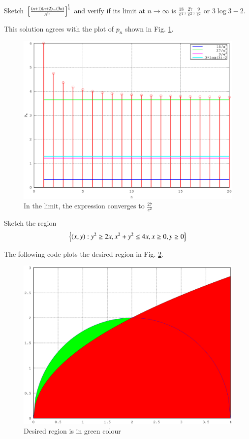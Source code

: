 \documentclass[journal,12pt,twocolumn]{IEEEtran}
\begin{document}
%
\begin{problem}
Sketch ${}\left[\frac{\left(n+1\right)\left(n+2\right)\dots \left(3n\right)}{n^{2n}}\right]^{\frac{1}{n}}$ and verify if its limit at $n \rightarrow \infty $ is $\frac{18}{e^4},\frac{27}{e^2},\frac{9}{e^2}$ or $3\log 3 -2$.
\end{problem}
\solution	

This solution agrees with the plot of $p_n$ shown in Fig. \ref{fig_32}.

%
\begin{figure}[h]
\centering
\includegraphics[width=\columnwidth]{./version_2/ee16b1032/ee16b1032}
\caption{ In the limit, the expression converges to $\frac{27}{e^2}$}
\label{fig_32}	
\end{figure}
%
\begin{problem}
Sketch the region 
\begin{equation*}
\left\{\left(x,y\right): y^2 \geq 2x, x^2+y^2 \leq 4x, x \geq 0, y \geq 0 \right\}
\end{equation*}
\end{problem}
\solution
The following code plots the desired region in Fig. \ref{fig_33}.

%
\begin{figure}[h]
\centering
\includegraphics[width=\columnwidth]{./version_2/ee16b1033/ee16b1033}
\caption{ Desired region is in green colour}
\label{fig_33}	
\end{figure}
\end{document}

